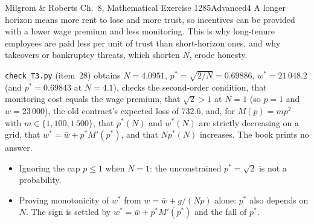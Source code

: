 \begin{exsol}{Milgrom \& Roberts Ch.~8, Mathematical Exercise 1}{285}{Advanced}{4}
\interp A longer horizon means more rent to lose and more trust, so incentives can be provided with a lower wage
premium and less monitoring. This is why long-tenure employees are paid less per unit of trust than
short-horizon ones, and why takeovers or bankruptcy threats, which shorten $N$, erode honesty.

\verify \texttt{check\_T3.py} (item~28) obtains $N = 4.0951$, $p^* = \sqrt{2/N} = 0.69886$, $w^* = 21\,048.2$ (and
$p^* = 0.69843$ at $N = 4.1$), checks the second-order condition, that monitoring cost equals the wage premium,
that $\sqrt2 > 1$ at $N = 1$ (so $p = 1$ and $w = 23\,000$), the old contract's expected loss of $732.6$, and, for
$M(p) = mp^2$ with $m \in \{1, 100, 1\,500\}$, that $p^*(N)$ and $w^*(N)$ are strictly decreasing on a grid, that
$w^* = \bar w + p^*M'(p^*)$, and that $Np^*(N)$ increases. The book prints no answer.

\mistakes
\begin{itemize}
  \item Ignoring the cap $p \le 1$ when $N = 1$: the unconstrained $p^* = \sqrt2$ is not a probability.
  \item Proving monotonicity of $w^*$ from $w = \bar w + g/(Np)$ alone: $p^*$ also depends on $N$. The sign is
  settled by $w^* = \bar w + p^*M'(p^*)$ and the fall of $p^*$.
\end{itemize}

\end{exsol}
